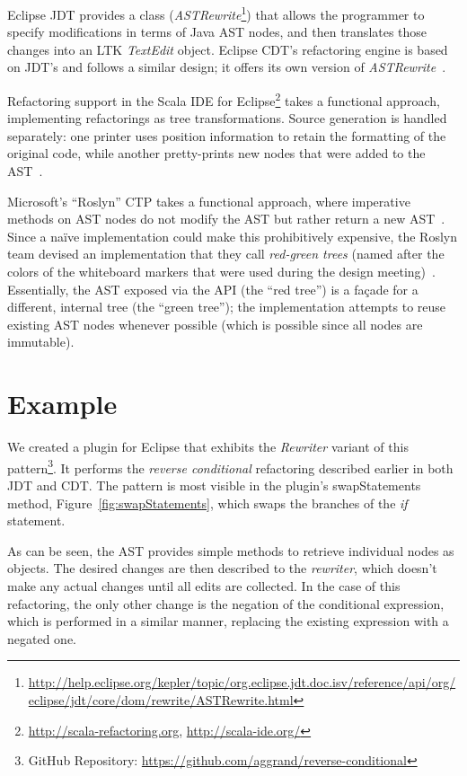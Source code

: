 \documentclass[prodmode]{acmlarge}
\begin{document}
Eclipse JDT provides a class (\textit{ASTRewrite}\footnote{\url{http://help.eclipse.org/kepler/topic/org.eclipse.jdt.doc.isv/reference/api/org/eclipse/jdt/core/dom/rewrite/ASTRewrite.html}}) that allows the programmer
to specify modifications in terms of Java AST nodes, and then translates those
changes into an LTK \textit{TextEdit} object.  Eclipse CDT's refactoring engine
is based on JDT's and follows a similar design; it offers its own version of
\textit{ASTRewrite}~\cite{cdt-refactoring}.

Refactoring support in the Scala IDE for
Eclipse\footnote{\url{http://scala-refactoring.org},
\url{http://scala-ide.org/}} takes a functional approach, implementing
refactorings as tree transformations.  Source generation is handled separately:
one printer uses position information to retain the formatting of the original
code, while another pretty-prints new nodes that were added to the
AST~\cite{stocker10scala}.

Microsoft's ``Roslyn'' CTP takes a functional approach, where imperative
methods on AST nodes do not modify the AST but rather return a new
AST~\cite{vogel12roslyn}.  Since a na\"{i}ve implementation could make this
prohibitively expensive, the Roslyn team devised an implementation that
they call \textit{red-green trees} (named after the colors of the
whiteboard markers that were used during the design
meeting)~\cite{lippert12persistence}.  Essentially, the AST exposed via the API
(the ``red tree'') is a fa\c{c}ade for a different, internal tree (the ``green
tree''); the implementation attempts to reuse existing AST nodes whenever
possible (which is possible since all nodes are immutable).


\section{Example}
We created a plugin for Eclipse that exhibits the \emph{Rewriter} variant of this
pattern\footnote{GitHub Repository: \url{https://github.com/aggrand/reverse-conditional}}. It performs the \emph{reverse conditional} refactoring described 
earlier in both JDT and CDT. The pattern is most visible in the plugin's
swapStatements method, Figure~\ref{fig:swapStatements}, which swaps the 
branches of the \emph{if} statement.

As can be seen, the AST provides simple methods to retrieve individual nodes as
objects. The desired changes are then described to the \emph{rewriter}, which
doesn't make any actual changes until all edits are collected. In the case of
this refactoring, the only other change is the negation of the conditional 
expression, which is performed in a similar manner, replacing the existing
expression with a negated one. 
\end{document}
